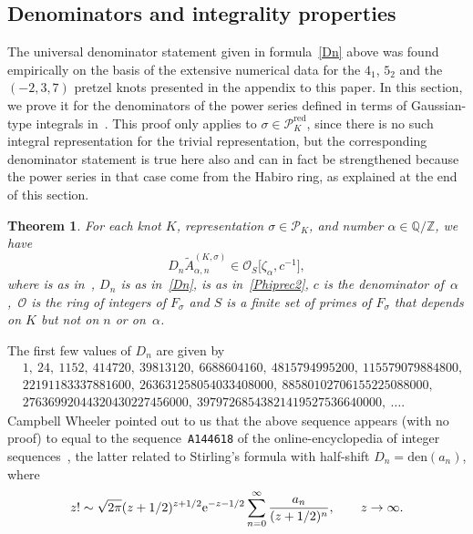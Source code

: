 \documentclass[pdftex]{sigma}
\numberwithin{equation}{section}
\newtheorem{Theorem}{Theorem}[section]
\def\BZ{\mathbb Z}
\def\BQ{\mathbb Q}
\def\calP{\mathcal P}
\def\calP{\mathcal P}
\def\calO{\mathcal O}
\def\wt{\widetilde}
\def\z{\zeta}
\def\a{\alpha}
\def\a{\alpha}
\def\z{\zeta}
\def\s{\sigma}
\def\tiA{\wt A}
\def\RED{^{\text{red}}}
\begin{document}
\subsection{Denominators and integrality properties}
\label{sub.denominators}


The universal denominator statement given in formula~\eqref{Dn} above was found empirically
on the basis of the extensive numerical data for the $4_1$, $5_2$ and the $(-2,3,7)$ pretzel
knots presented in the appendix to this paper. In this section, we prove it for the denominators
of the power series defined in terms of Gaussian-type integrals in~\cite{DG2}.
This proof only applies to $\s\in\calP\RED_K$, since there is no such integral representation
for the trivial representation, but the corresponding denominator statement is true here also
and can in fact be strengthened because the power series in that case come
from the Habiro ring, as explained at the end of this section.

\begin{Theorem}
\label{thm.denom}
For each knot $K$, representation $\s\in\calP_K$, and number $\a \in \BQ/\BZ$, we have
\[%
D_n  \tiA^{(K,\s)}_{\a,n} \in \calO_S\big[\z_\a,c^{-1}\big],
\]
where \smash{$\Phi_\a^{(K,\s)}(h)$} is as in~{\rm \cite{DG2}}, $D_n$ is as in~\eqref{Dn},
\smash{$\tiA^{(K,\s)}_{\a,n}$} is as in~\eqref{Phiprec2}, $c$ is the denominator of~$\a$,~$\calO$ is the ring of integers of $F_\s$ and $S$ is a finite set of primes
of $F_\s$ that depends on $K$ but not on $n$ or on~$\a$.
\end{Theorem}

The first few values of $D_n$ are given by
\begin{align*}%
&   1, \ 24, \ 1152, \ 414720, \ 39813120,  \ 6688604160, \ 4815794995200, \  115579079884800, \\
&  22191183337881600, \ 263631258054033408000, \ 88580102706155225088000, \\
&   27636992044320430227456000, \ 39797268543821419527536640000, \ \dots.
\end{align*}
Campbell Wheeler pointed out to us that the above sequence appears (with no proof)
to equal to the sequence~\texttt{A144618} of the online-encyclopedia of integer
sequences~\cite{OEIS}, the latter related to Stirling's formula with half-shift
$D_n=\text{den}(a_n)$, where
\[%
z! \sim \sqrt{2\pi} (z+1/2)^{z+1/2} {\rm e}^{-z-1/2}
\sum_{n=0}^\infty \frac{a_n}{(z+1/2)^n},
\qquad z \to \infty .
\]
\end{document}
